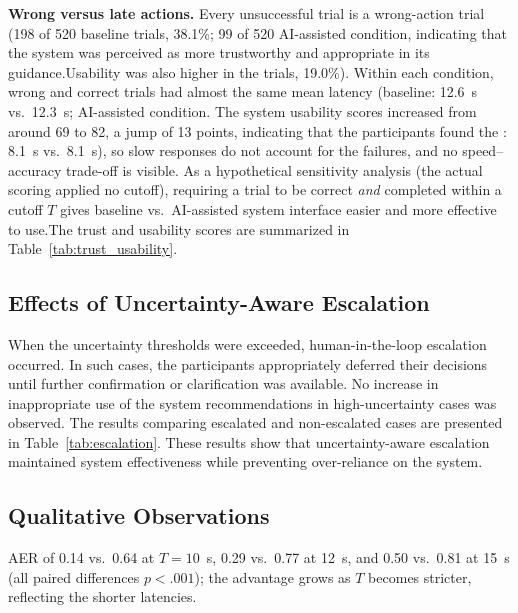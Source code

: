 \documentclass[journal]{IEEEtran}
\theoremstyle{plain}
\theoremstyle{definition}
\providecommand{\DIFaddtex}[1]{{\protect\color{blue} \sf #1}} %
\providecommand{\DIFdeltex}[1]{{\protect\color{red} \scriptsize #1}} %
\providecommand{\DIFaddbegin}{} %
\providecommand{\DIFaddend}{} %
\providecommand{\DIFdelbegin}{} %
\providecommand{\DIFdelend}{} %
\providecommand{\DIFadd}[1]{\texorpdfstring{\DIFaddtex{#1}}{#1}} %
\providecommand{\DIFdel}[1]{\texorpdfstring{\DIFdeltex{#1}}{}} %
\newcommand{\DIFscaledelfig}{0.5}
\newlength{\DIFdelgraphicswidth} %
\newlength{\DIFdelgraphicsheight} %
\newcommand{\DIFaddincludegraphics}[2][]{{\color{blue}\fbox{\DIFOincludegraphics[#1]{#2}}}} %
\newcommand{\DIFdelincludegraphics}[2][]{%
\sbox{\DIFdelgraphicsbox}{\DIFOincludegraphics[#1]{#2}}%
\settoboxwidth{\DIFdelgraphicswidth}{\DIFdelgraphicsbox} %
\settoboxtotalheight{\DIFdelgraphicsheight}{\DIFdelgraphicsbox} %
\scalebox{\DIFscaledelfig}{%
\parbox[b]{\DIFdelgraphicswidth}{\usebox{\DIFdelgraphicsbox}\\[-\baselineskip] \rule{\DIFdelgraphicswidth}{0em}}\llap{\resizebox{\DIFdelgraphicswidth}{\DIFdelgraphicsheight}{%
\setlength{\unitlength}{\DIFdelgraphicswidth}%
\begin{picture}(1,1)%
\thicklines\linethickness{2pt} %
{\color[rgb]{1,0,0}\put(0,0){\framebox(1,1){}}}%
{\color[rgb]{1,0,0}\put(0,0){\line( 1,1){1}}}%
{\color[rgb]{1,0,0}\put(0,1){\line(1,-1){1}}}%
\end{picture}%
}\hspace*{3pt}}} %
} %
\DeclareRobustCommand{\DIFaddbegin}{\DIFOaddbegin \let\includegraphics\DIFaddincludegraphics} %
\DeclareRobustCommand{\DIFaddend}{\DIFOaddend \let\includegraphics\DIFOincludegraphics} %
\DeclareRobustCommand{\DIFdelbegin}{\DIFOdelbegin \let\includegraphics\DIFdelincludegraphics} %
\DeclareRobustCommand{\DIFdelend}{\DIFOaddend \let\includegraphics\DIFOincludegraphics} %
\begin{document}
    \DIFadd{\textbf{Wrong versus late actions.} Every unsuccessful trial is a wrong-action trial (198 of 520 baseline trials, 38.1\%; 99 of 520 }\DIFaddend AI-assisted \DIFdelbegin \DIFdel{condition, indicating that the system was perceived as more trustworthy and appropriate in its guidance.Usability was also higher in the }\DIFdelend \DIFaddbegin \DIFadd{trials, 19.0\%). Within each condition, wrong and correct trials had almost the same mean latency (baseline: 12.6~s vs.\ 12.3~s; }\DIFaddend AI-assisted\DIFdelbegin \DIFdel{condition.
The system usability scores increased from around 69 to 82, a jump of 13 points, indicating that the participants found the }\DIFdelend \DIFaddbegin \DIFadd{: 8.1~s vs.\ 8.1~s), so slow responses do not account for the failures, and no speed--accuracy trade-off is visible. As a hypothetical sensitivity analysis (the actual scoring applied no cutoff), requiring a trial to be correct \emph{and} completed within a cutoff $T$ gives baseline vs.\ }\DIFaddend AI-assisted \DIFdelbegin \DIFdel{system interface easier and more effective to use.The trust and usability scores are summarized in Table~\ref{tab:trust_usability}.}%

\subsection{\DIFdel{Effects of Uncertainty-Aware Escalation}}
\addtocounter{subsection}{-1}%
\DIFdel{When the uncertainty thresholds were exceeded, human-in-the-loop escalation occurred. In such cases, the participants appropriately deferred their decisions until further confirmation or clarification was available. No increase in inappropriate use of the system recommendations in high-uncertainty cases was observed. The results comparing escalated and non-escalated cases are presented in Table~\ref{tab:escalation}. These results show that uncertainty-aware escalation maintained system effectiveness while preventing over-reliance on the system. }%

\subsection{\DIFdel{Qualitative Observations}}
\addtocounter{subsection}{-1}%
\DIFdelend \DIFaddbegin \DIFadd{AER of 0.14 vs.\ 0.64 at $T=10$~s, 0.29 vs.\ 0.77 at 12~s, and 0.50 vs.\ 0.81 at 15~s (all paired differences $p<.001$); the advantage grows as $T$ becomes stricter, reflecting the shorter latencies.
}\DIFaddend 
\end{document}
